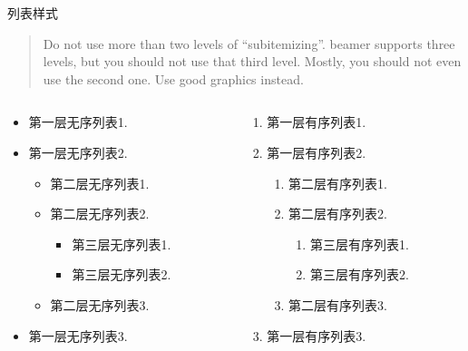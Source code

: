 \documentclass[
aspectratio=169,%
]{beamer}
\begin{document}
\begin{frame}{列表样式}
\begin{quote}
    Do not use more than two levels of ``subitemizing''. beamer supports three levels, but you should not use that third level. Mostly, you should not even use the second one. Use good graphics instead.
    \cite{beamer-user-guide}
\end{quote}

\begin{columns}
    \begin{column}{0.5\linewidth}
        \begin{itemize}
            \item 第一层无序列表1.
            \item 第一层无序列表2.
            \begin{itemize}
                \item 第二层无序列表1.
                \item 第二层无序列表2.
                \begin{itemize}
                    \item 第三层无序列表1.
                    \item 第三层无序列表2.
                \end{itemize}
                \item 第二层无序列表3.
            \end{itemize}
            \item 第一层无序列表3.
        \end{itemize}
    \end{column}

    \begin{column}{0.5\linewidth}
        \begin{enumerate}
            \item 第一层有序列表1.
            \item 第一层有序列表2.
            \begin{enumerate}
                \item 第二层有序列表1.
                \item 第二层有序列表2.
                \begin{enumerate}
                    \item 第三层有序列表1.
                    \item 第三层有序列表2.
                \end{enumerate}
                \item 第二层有序列表3.
            \end{enumerate}
            \item 第一层有序列表3.
        \end{enumerate}
    \end{column}
\end{columns}
\end{frame}
\end{document}
